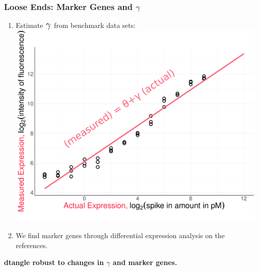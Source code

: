 \documentclass[usenames,dvipsnames,15pt,handout]{beamer}
\renewcommand{\alert}[1]{{\color{NavyBlue} #1}}
\newcommand{\crb}{\color{RoyalBlue}}
\newcommand{\cbr}{\color{BrickRed}}
\newcommand{\tn}{\text{\Large $\theta$}_{\cbr g}}
\newcommand{\slope}{\text{\Large $\gamma$}}
\begin{document}
\begin{frame}
  \frametitle{Loose Ends: Marker Genes and $\gamma$}
  \begin{enumerate}
  \item Estimate $\slope$ from \alert{benchmark data sets}:
    \hspace*{2cm}\includegraphics[scale=.17]{pictures/ma_mod_plot}
  \item We find \alert{marker genes} through \alert{differential expression analysis} on the references.
  \end{enumerate}
  {\bf dtangle robust to changes in $\gamma$ and marker genes.}
\end{frame}

%  
\end{document}
